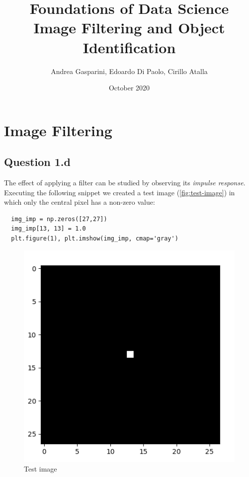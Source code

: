 \documentclass{article}
\title{Foundations of Data Science \\ Image Filtering and Object Identification}
\author{Andrea Gasparini, Edoardo Di Paolo, Cirillo Atalla}
\date{October 2020}
\begin{document}
\maketitle
{
  \hypersetup{linkcolor=black}
  \tableofcontents
}
\newpage

\section{Image Filtering}

\subsection{Question 1.d}
The effect of applying a filter can be studied by observing its \textit{impulse response}. Executing the following snippet we created a test image (\autoref{fig:test-image}) in which only the central pixel has a non-zero value:
\begin{verbatim}
  img_imp = np.zeros([27,27])
  img_imp[13, 13] = 1.0
  plt.figure(1), plt.imshow(img_imp, cmap='gray')
\end{verbatim}

\begin{figure}[ht]
    \centering
    \includegraphics[scale=0.4]{images/Q1.d-F1.png}
    \caption{Test image}
    \label{fig:test-image}
\end{figure}
\end{document}
